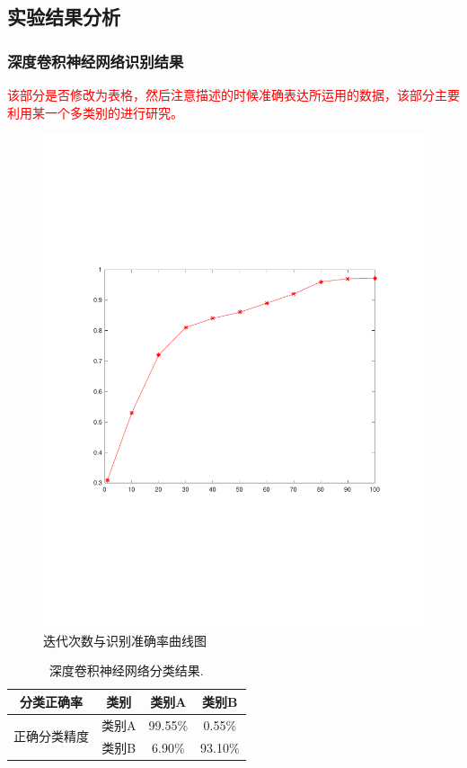 \subsection{实验结果分析}

\subsubsection{深度卷积神经网络识别结果}

\textcolor{red}{该部分是否修改为表格，然后注意描述的时候准确表达所运用的数据，该部分主要利用某一个多类别的进行研究。}
\begin{figure}
	\centering
	\includegraphics[width=\textwidth]{figures/diff_epoch.pdf}
	\caption{迭代次数与识别准确率曲线图}
	\label{fig:openset_epoch}
\end{figure}

\begin{table}[H]
	\renewcommand{\arraystretch}{1.3}
	\caption{深度卷积神经网络分类结果.}
	\centering
	\begin{tabular}{c|c|c|c}
		\hline
		 分类正确率 & 类别 & 类别A & 类别B \\
		 \hline
		\multirow{2}{*}{正确分类精度}
		 & 类别A & 99.55\% & 0.55\% \\
		\cline{2-4}
		 & 类别B & 6.90\% & 93.10\% \\		
		
		\hline
	\end{tabular}
\end{table}


